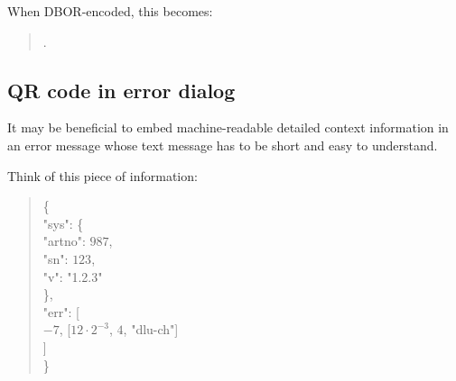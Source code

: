 \begin{BeginParPenalty}
    When DBOR-encoded, this becomes:
    \begin{quote}
        \ByteSequence{
            \DborFirstByteHex{Number}{26},
            \DborFirstByteHex{Sequence}{8A}, %
                \DborFirstByteHex{Number}{C8}, \DborNextByteHex{38},
                \DborFirstByteHex{Number}{04},
                \DborFirstByteHex{String}{66},
                    \DborNextByteHex{64}, \DborNextByteHex{6C}, \DborNextByteHex{75}, \DborNextByteHex{2D},
                    \DborNextByteHex{63}, \DborNextByteHex{68}
        }.
    \end{quote}
\end{BeginParPenalty}


\subsection{QR code in error dialog}

It may be beneficial to embed machine-readable detailed context information in
an error message whose text message has to be short and easy to understand.

\begin{BeginParPenalty}
    Think of this piece of information:
    \begin{quote}
        \newcommand{\h}{\hspace*{\leftmargin}}
        \{ \\
            \h "sys": \{ \\
                \h\h "artno": $987$, \\
                \h\h "sn": $123$, \\
                \h\h "v": "1.2.3" \\
            \h \}, \\
            \h "err": [ \\
                \h\h $-7$, [$12 \cdot 2^{-3}$, $4$, "dlu-ch"] \\
            \h ] \\
        \}
    \end{quote}
\end{BeginParPenalty}

